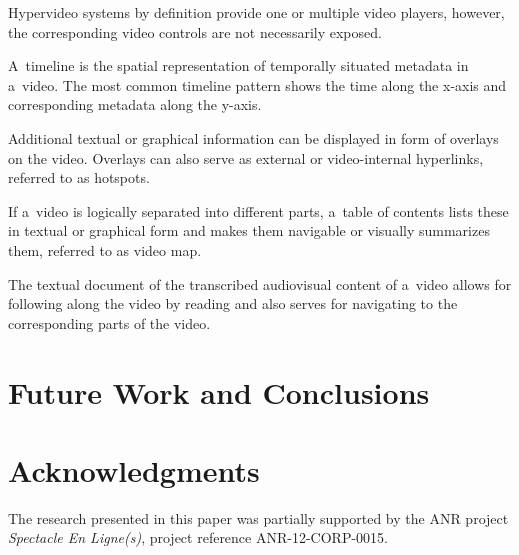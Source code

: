 \documentclass{sig-alternate}
\begin{document}
\begin{description}[leftmargin=*]
  \item[Video player and controls:] Hypervideo systems by definition
    provide one or multiple video players, however,
    the corresponding video controls are not necessarily exposed.
  \item[Timeline:] A~timeline is the spatial representation
    of temporally situated metadata in a~video.
    The most common timeline pattern shows the
    time along the x-axis and corresponding metadata along the y-axis.
  \item[Textual or graphical overlay:] Additional textual or graphical
    information can be displayed in form of overlays on the video.
    Overlays can also serve as external or video-internal hyperlinks,
    referred to as hotspots.
  \item[Textual or graphical table of contents:]
    If a~video is logically separated
    into different parts, a~table of contents lists these
    in textual or graphical form and makes them navigable
    or visually summarizes them, referred to as video map.
  \item[Transcript:] The textual document
    of the transcribed audiovisual content of a~video 
    allows for following along the video by reading
    and also serves for navigating to the corresponding
    parts of the video.
\end{description}  

\section{Future Work and Conclusions}

\section*{Acknowledgments}

The research presented in this paper
was partially supported by the ANR project
\emph{Spectacle En Ligne(s)}, project reference
\mbox{ANR-12-CORP-0015}.



\end{document}

